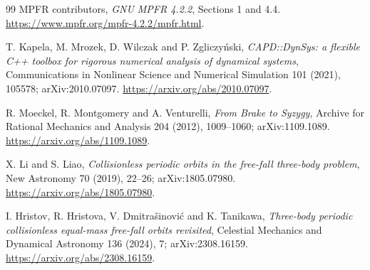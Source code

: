 \documentclass[10pt,a4paper]{article}
\theoremstyle{remark}
\begin{document}
\begin{thebibliography}{99}
MPFR contributors, \emph{GNU MPFR 4.2.2}, Sections 1 and 4.4.
\url{https://www.mpfr.org/mpfr-4.2.2/mpfr.html}.

T. Kapela, M. Mrozek, D. Wilczak and P. Zgliczy\'nski,
\emph{CAPD::DynSys: a flexible C++ toolbox for rigorous numerical analysis
of dynamical systems}, Communications in Nonlinear Science and Numerical
Simulation 101 (2021), 105578; arXiv:2010.07097.
\url{https://arxiv.org/abs/2010.07097}.

R. Moeckel, R. Montgomery and A. Venturelli,
\emph{From Brake to Syzygy}, Archive for Rational Mechanics and Analysis
204 (2012), 1009--1060; arXiv:1109.1089.
\url{https://arxiv.org/abs/1109.1089}.

X. Li and S. Liao, \emph{Collisionless periodic orbits in the free-fall
three-body problem}, New Astronomy 70 (2019), 22--26;
arXiv:1805.07980. \url{https://arxiv.org/abs/1805.07980}.

I. Hristov, R. Hristova, V. Dmitra\v{s}inovi\'c and K. Tanikawa,
\emph{Three-body periodic collisionless equal-mass free-fall orbits
revisited}, Celestial Mechanics and Dynamical Astronomy 136 (2024), 7;
arXiv:2308.16159. \url{https://arxiv.org/abs/2308.16159}.
\end{thebibliography}
\end{document}
